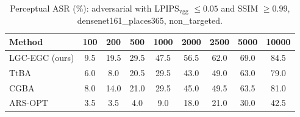 \begin{table}[t]
\centering\footnotesize
\caption{Perceptual ASR (\%): adversarial with LPIPS$_{\mathrm{vgg}}$ $\le 0.05$ and SSIM $\ge 0.99$, densenet161\_places365, non\_targeted.}
\begin{tabular}{lcccccccc}
\toprule
Method & 100 & 200 & 500 & 1000 & 2000 & 2500 & 5000 & 10000 \\
\midrule
LGC-EGC (ours) & 9.5 & 19.5 & 29.5 & 47.5 & 56.5 & 62.0 & 69.0 & 84.5 \\
TtBA & 6.0 & 8.0 & 20.5 & 29.5 & 43.0 & 49.0 & 63.0 & 79.0 \\
CGBA & 8.0 & 14.0 & 21.0 & 29.5 & 45.0 & 49.5 & 63.5 & 81.0 \\
ARS-OPT & 3.5 & 3.5 & 4.0 & 9.0 & 18.0 & 21.0 & 30.0 & 42.5 \\
\bottomrule
\end{tabular}
\end{table}

